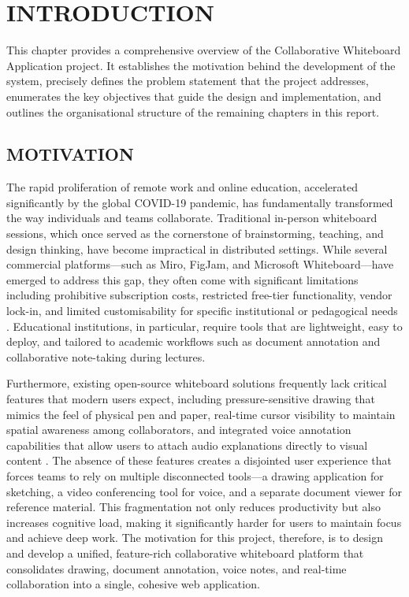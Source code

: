 \documentclass[12pt,a4paper]{report}
\begin{document}

\chapter{INTRODUCTION}
\thispagestyle{empty}

This chapter provides a comprehensive overview of the Collaborative Whiteboard Application project. It establishes the motivation behind the development of the system, precisely defines the problem statement that the project addresses, enumerates the key objectives that guide the design and implementation, and outlines the organisational structure of the remaining chapters in this report.

\section{MOTIVATION}

The rapid proliferation of remote work and online education, accelerated significantly by the global COVID-19 pandemic, has fundamentally transformed the way individuals and teams collaborate. Traditional in-person whiteboard sessions, which once served as the cornerstone of brainstorming, teaching, and design thinking, have become impractical in distributed settings. While several commercial platforms---such as Miro, FigJam, and Microsoft Whiteboard---have emerged to address this gap, they often come with significant limitations including prohibitive subscription costs, restricted free-tier functionality, vendor lock-in, and limited customisability for specific institutional or pedagogical needs \cite{ref1}. Educational institutions, in particular, require tools that are lightweight, easy to deploy, and tailored to academic workflows such as document annotation and collaborative note-taking during lectures.

Furthermore, existing open-source whiteboard solutions frequently lack critical features that modern users expect, including pressure-sensitive drawing that mimics the feel of physical pen and paper, real-time cursor visibility to maintain spatial awareness among collaborators, and integrated voice annotation capabilities that allow users to attach audio explanations directly to visual content \cite{ref2}. The absence of these features creates a disjointed user experience that forces teams to rely on multiple disconnected tools---a drawing application for sketching, a video conferencing tool for voice, and a separate document viewer for reference material. This fragmentation not only reduces productivity but also increases cognitive load, making it significantly harder for users to maintain focus and achieve deep work. The motivation for this project, therefore, is to design and develop a unified, feature-rich collaborative whiteboard platform that consolidates drawing, document annotation, voice notes, and real-time collaboration into a single, cohesive web application.
\end{document}
